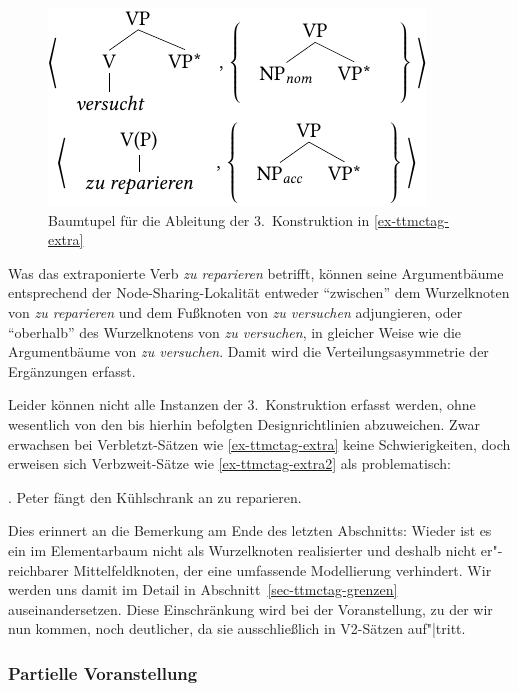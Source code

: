 \begin{figure}[t]
\centering
\includegraphics{graphics/abb715.pdf}
\caption{\label{fig-ttmctag-3konstr}Baumtupel für die Ableitung der 3.~Konstruktion in \ref{ex-ttmctag-extra}}
\end{figure}

Was das extraponierte Verb {\it zu reparieren} betrifft, können seine Argumentbäume entsprechend der Node-Sharing-Lokalität entweder "`zwischen"' dem Wurzelknoten von {\it zu reparieren} und dem Fu\ss knoten von {\it zu versuchen} adjungieren, oder "`oberhalb"' des Wurzelknotens von {\it zu versuchen}, in gleicher Weise wie die Argumentbäume von {\it zu versuchen}. Damit wird die Verteilungsasymmetrie der Er\-gän\-zungen erfasst. 

Leider können nicht alle Instanzen der 3.~Konstruktion erfasst werden, ohne wesentlich von den bis hierhin befolgten Designrichtlinien abzuweichen. Zwar erwachsen bei Verbletzt-Sätzen wie \ref{ex-ttmctag-extra} keine Schwierigkeiten, doch erweisen sich Verbzweit-Sätze wie \ref{ex-ttmctag-extra2} als problematisch: 

\ex. Peter fängt den Kühlschrank an zu reparieren. \label{ex-ttmctag-extra2}

Dies erinnert an die Bemerkung am Ende des letzten Abschnitts: Wieder ist es ein im Elementarbaum nicht als Wurzelknoten realisierter und deshalb nicht er"-reichbarer Mittelfeldknoten, der eine umfassende Modellierung verhindert. Wir werden uns damit im Detail in Abschnitt~\ref{sec-ttmctag-grenzen} auseinandersetzen. Diese Einschränkung wird bei der Voranstellung, zu der wir nun kommen, noch deutlicher, da sie ausschlie\ss lich in V2-Sätzen auf"|tritt.


\subsubsection*{Partielle Voranstellung}

